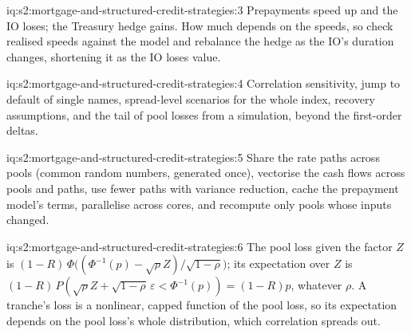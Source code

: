 \begin{solution}{iq:s2:mortgage-and-structured-credit-strategies:3}
Prepayments speed up and the IO loses; the Treasury hedge gains. How much depends on the speeds, so check realised speeds against the model and
rebalance the hedge as the IO's duration changes, shortening it as the IO loses value.
\end{solution}

\begin{solution}{iq:s2:mortgage-and-structured-credit-strategies:4}
Correlation sensitivity, jump to default of single names, spread-level scenarios for the whole index, recovery assumptions, and the tail of pool
losses from a simulation, beyond the first-order deltas.
\end{solution}

\begin{solution}{iq:s2:mortgage-and-structured-credit-strategies:5}
Share the rate paths across pools (common random numbers, generated once), vectorise the cash flows across pools and paths, use fewer paths with
variance reduction, cache the prepayment model's terms, parallelise across cores, and recompute only pools whose inputs changed.
\end{solution}

\begin{solution}{iq:s2:mortgage-and-structured-credit-strategies:6}
The pool loss given the factor $Z$ is $(1-R)\,\Phi\bigl((\Phi^{-1}(p) - \sqrt\rho Z)/\sqrt{1-\rho}\bigr)$; its expectation over $Z$ is
$(1-R)\,P(\sqrt\rho Z + \sqrt{1-\rho}\,\varepsilon < \Phi^{-1}(p)) = (1-R)p$, whatever $\rho$. A tranche's loss is a nonlinear, capped function of the
pool loss, so its expectation depends on the pool loss's whole distribution, which correlation spreads out.
\end{solution}
